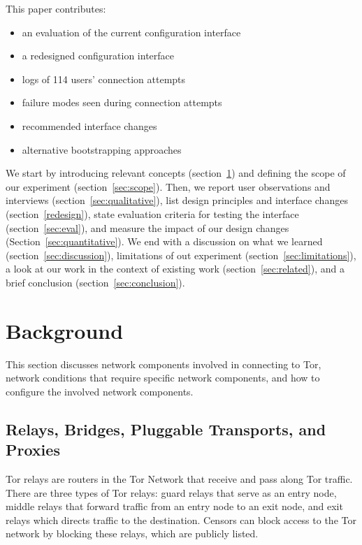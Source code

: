 \documentclass[USenglish,oneside,twocolumn]{article}
\begin{document}
\noindent This paper contributes:
\smallskip
\begin{itemize}
\item an evaluation of the current configuration interface
\item a redesigned configuration interface
\item logs of 114 users' connection attempts
\item failure modes seen during connection attempts
\item recommended interface changes
\item alternative bootstrapping approaches
\end{itemize}

We start by introducing relevant concepts (section~\ref{sec:background}) and
defining the scope of our experiment (section~\ref{sec:scope}). 
Then, we report user observations and interviews (section~\ref{sec:qualitative}),
list design principles and interface changes (section~\ref{redesign}),
state evaluation criteria for testing the interface (section~\ref{sec:eval}), 
and measure the impact of our design changes (Section~\ref{sec:quantitative}).
We end with a discussion on what we learned (section~\ref{sec:discussion}),
limitations of out experiment (section~\ref{sec:limitations}), 
a look at our work in the context of existing work (section~\ref{sec:related}), and
a brief conclusion (section~\ref{sec:conclusion}).

\section{Background}
\label{sec:background}
This section discusses network components involved in connecting to Tor, network conditions that require specific network components, and how to configure the involved network components. 

\subsection{Relays, Bridges, Pluggable Transports, and Proxies} 

Tor relays are routers in the Tor Network that receive and pass along Tor traffic. 
There are three types of Tor relays: guard relays that serve as an entry node, middle relays that forward traffic from an entry node to an exit node, and exit relays which directs traffic to the destination. 
Censors can block access to the Tor network by blocking these relays, which are publicly listed. 
\end{document}
